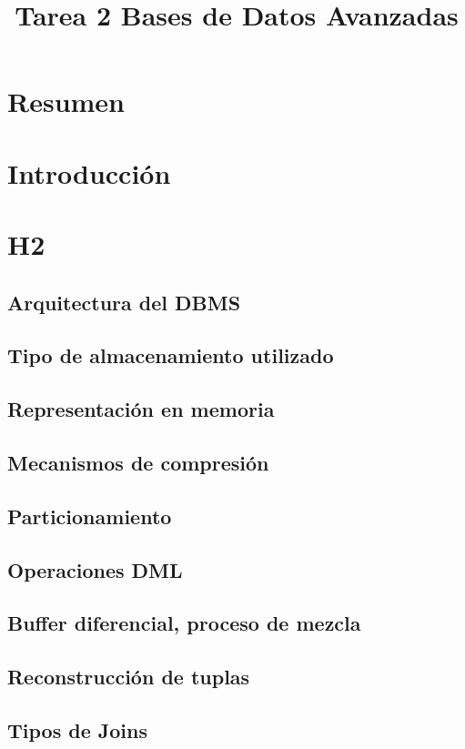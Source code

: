 \documentclass{acmart}
\title{Tarea 2 Bases de Datos Avanzadas}
\begin{document}
\maketitle

\tableofcontents

\section{Resumen}

\section{Introducción}

\section{H2}
\subsection{Arquitectura del DBMS}
\subsection{Tipo de almacenamiento utilizado}
\subsection{Representación en memoria}
\subsection{Mecanismos de compresión}
\subsection{Particionamiento}
\subsection{Operaciones DML}
\subsection{Buffer diferencial, proceso de mezcla}
\subsection{Reconstrucción de tuplas}
\subsection{Tipos de Joins}
\end{document}

